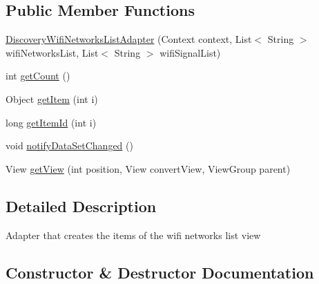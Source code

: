 \subsection*{Public Member Functions}
\begin{DoxyCompactItemize}
\item 
\hyperlink{classandroid_1_1app_1_1printerapp_1_1devices_1_1discovery_1_1_discovery_wifi_networks_list_adapter_a57f01d8176eb22198559300fd8e7de27}{Discovery\+Wifi\+Networks\+List\+Adapter} (Context context, List$<$ String $>$ wifi\+Networks\+List, List$<$ String $>$ wifi\+Signal\+List)
\item 
int \hyperlink{classandroid_1_1app_1_1printerapp_1_1devices_1_1discovery_1_1_discovery_wifi_networks_list_adapter_ac1e2286859c0e0e6a2c7a162460aa062}{get\+Count} ()
\item 
Object \hyperlink{classandroid_1_1app_1_1printerapp_1_1devices_1_1discovery_1_1_discovery_wifi_networks_list_adapter_a6175d2d3ada6b459ee12ac4f38b5474b}{get\+Item} (int i)
\item 
long \hyperlink{classandroid_1_1app_1_1printerapp_1_1devices_1_1discovery_1_1_discovery_wifi_networks_list_adapter_a51043ad003b9a27487e132275e4839a2}{get\+Item\+Id} (int i)
\item 
void \hyperlink{classandroid_1_1app_1_1printerapp_1_1devices_1_1discovery_1_1_discovery_wifi_networks_list_adapter_a863f10237303083bcb95a68676c89169}{notify\+Data\+Set\+Changed} ()
\item 
View \hyperlink{classandroid_1_1app_1_1printerapp_1_1devices_1_1discovery_1_1_discovery_wifi_networks_list_adapter_af429fc67edfd198f3d9b41cc6b12165e}{get\+View} (int position, View convert\+View, View\+Group parent)
\end{DoxyCompactItemize}


\subsection{Detailed Description}
Adapter that creates the items of the wifi networks list view 

\subsection{Constructor \& Destructor Documentation}
\mbox{\label{classandroid_1_1app_1_1printerapp_1_1devices_1_1discovery_1_1_discovery_wifi_networks_list_adapter_a57f01d8176eb22198559300fd8e7de27}} 
